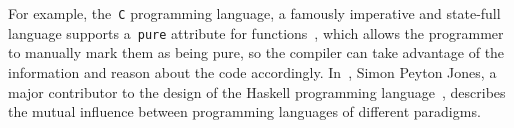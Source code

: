 \documentclass[a4paper]{article}
\theoremstyle{plain}
\theoremstyle{definition}
\begin{document}
For example, the~\texttt{C} programming language, a famously imperative
and state-full language supports a~\texttt{pure} attribute for
functions~\cite{gccdoc:attributes}, which allows the programmer to manually mark
them as being pure, so the compiler can take advantage of the information and
reason about the code accordingly.  In~\cite{haskell-useless}, Simon Peyton
Jones, a major contributor to the design of the Haskell programming
language~\cite{Simeone}, describes the mutual influence between programming
languages of different paradigms.

\printbibliography
\end{document}

